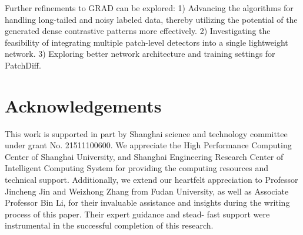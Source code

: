 \documentclass[letterpaper]{article} %
\begin{document}
Further refinements to GRAD can be explored: 1) Advancing the algorithms for handling long-tailed and noisy labeled data, thereby utilizing the potential of the generated dense contrastive patterns more effectively. 2) Investigating the feasibility of integrating multiple patch-level detectors into a single lightweight network. 3) Exploring better network architecture and training settings for PatchDiff.

\section{Acknowledgements}

This work is supported in part by Shanghai science and technology committee under grant No. 21511100600.  We appreciate the High Performance Computing Center of Shanghai University, and Shanghai Engineering Research Center of Intelligent Computing System for providing the computing resources and technical support. Additionally, we extend our heartfelt appreciation to Professor Jincheng Jin and Weizhong Zhang from Fudan University, as well as Associate Professor Bin Li, for their invaluable assistance and insights during the writing process of this paper. Their expert guidance and stead- fast support were instrumental in the successful completion of this research.



% 

\onecolumn{}
\end{document}
